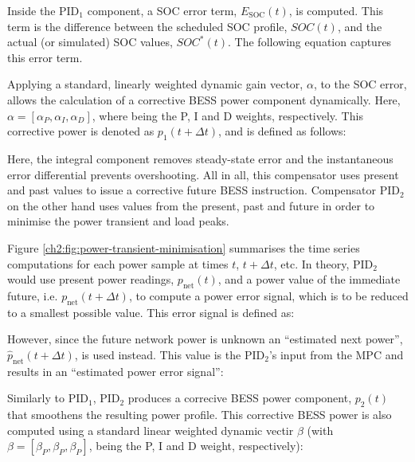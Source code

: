 Inside the PID$_1$ component, a SOC error term, $E_\text{SOC}(t)$, is computed.
This term is the difference between the scheduled SOC profile, $SOC(t)$, and the actual (or simulated) SOC values, $SOC^*(t)$.
The following equation captures this error term.



Applying a standard, linearly weighted dynamic gain vector, $\alpha$, to the SOC error, allows the calculation of a corrective BESS power component dynamically.
Here, $\alpha = [\alpha_P, \alpha_I, \alpha_D]$, where being the P, I and D weights, respectively.
This corrective power is denoted as $p_1(t+\Delta t)$, and is defined as follows:



Here, the integral component removes steady-state error and the instantaneous error differential prevents overshooting.
All in all, this compensator uses present and past values to issue a corrective future BESS instruction.
Compensator PID$_2$ on the other hand uses values from the present, past and future in order to minimise the power transient and load peaks.



Figure \ref{ch2:fig:power-transient-minimisation} summarises the time series computations for each power sample at times $t$, $t+\Delta t$, etc.
In theory, PID$_2$ would use present power readings, $p_\text{net}(t)$, and a power value of the immediate future, i.e. $p_\text{net}(t+\Delta t)$, to compute a power error signal, which is to be reduced to a smallest possible value.
This error signal is defined as:



However, since the future network power is unknown an ``estimated next power'', $\hat{p}_\text{net}(t+\Delta t)$, is used instead.
This value is the PID$_2$'s input from the MPC and results in an ``estimated power error signal'':



Similarly to PID$_1$, PID$_2$ produces a correcive BESS power component, $p_2(t)$ that smoothens the resulting power profile.
This corrective BESS power is also computed using a standard linear weighted dynamic vectir $\beta$ (with $\beta = [\beta_P, \beta_P, \beta_P]$, being the P, I and D weight, respectively):



